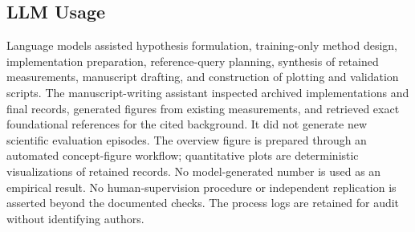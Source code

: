 \documentclass{article}
\begin{document}
\subsection{LLM Usage}
Language models assisted hypothesis formulation, training-only method design, implementation preparation, reference-query planning, synthesis of retained measurements, manuscript drafting, and construction of plotting and validation scripts. The manuscript-writing assistant inspected archived implementations and final records, generated figures from existing measurements, and retrieved exact foundational references for the cited background. It did not generate new scientific evaluation episodes. The overview figure is prepared through an automated concept-figure workflow; quantitative plots are deterministic visualizations of retained records. No model-generated number is used as an empirical result. No human-supervision procedure or independent replication is asserted beyond the documented checks. The process logs are retained for audit without identifying authors.
\end{document}
